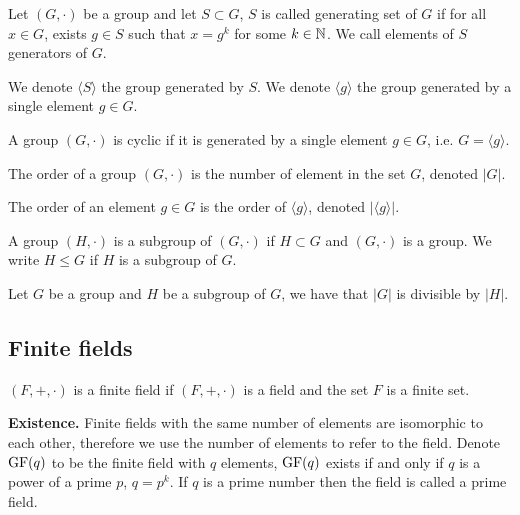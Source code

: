 \begin{definition}
Let $(G, \cdot)$ be a group and let $S \subset G$, $S$ is called \textup{generating set} of $G$ if for all $x \in G$, exists $g \in S$ such that $x = g^k$ for some $k \in \mathbb{N}$. We call elements of $S$ \textup{generators} of $G$.

We denote $\langle S \rangle$ the group generated by $S$. We denote $\langle g \rangle$ the group generated by a single element $g \in G$.
\end{definition}

\begin{definition}
A group $(G, \cdot)$ is \textup{cyclic} if it is generated by a single element $g \in G$, i.e. $G = \langle g \rangle$.
\end{definition}

\begin{definition}[Orders]
The \textup{order} of a group $(G, \cdot)$ is the number of element in the set $G$, denoted $|G|$.

The order of an element $g \in G$ is the order of $\langle g \rangle$, denoted $|\langle g \rangle|$.
\end{definition}

\begin{definition}[Subgroup]
A group $(H, \cdot)$ is a \textup{subgroup} of $(G, \cdot)$ if $H \subset G$ and $(G, \cdot)$ is a group. We write $H \le G$ if $H$ is a subgroup of $G$.
\end{definition}

\begin{theorem}
Let $G$ be a group and $H$ be a subgroup of $G$, we have that $|G|$ is divisible by $|H|$.
\end{theorem}

\subsection{Finite fields}

\begin{definition}
$(F, +, \cdot)$ is a \textup{finite field} if $(F, +, \cdot)$ is a \textup{field} and the set $F$ is a finite set.
\end{definition}

\textbf{Existence.} Finite fields with the same number of elements are isomorphic to each other, therefore we use the number of elements to refer to the field. Denote $\mathrm{GF}(q)$ to be the finite field with $q$ elements, $\mathrm{GF}(q)$ exists if and only if $q$ is a power of a prime $p$, $q = p^k$. If $q$ is a prime number then the field is called a prime field.

